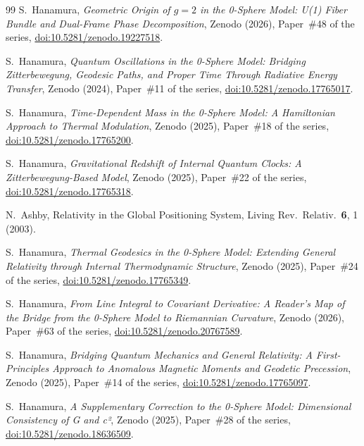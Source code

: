 \documentclass[%
 reprint, amsmath,amssymb, aps, prb, ]{revtex4-2}
\numberwithin{equation}{section}
\begin{document}
\begin{thebibliography}{99}
 S.~Hanamura, \emph{Geometric Origin of $g = 2$ in the 0-Sphere Model: U(1) Fiber Bundle and Dual-Frame Phase Decomposition}, Zenodo (2026), Paper~\#48 of the series, \href{https://doi.org/10.5281/zenodo.19227518}{doi:10.5281/zenodo.19227518}.

 S.~Hanamura, \emph{Quantum Oscillations in the 0-Sphere Model: Bridging Zitterbewegung, Geodesic Paths, and Proper Time Through Radiative Energy Transfer}, Zenodo (2024), Paper~\#11 of the series, \href{https://doi.org/10.5281/zenodo.17765017}{doi:10.5281/zenodo.17765017}.

 S.~Hanamura, \emph{Time-Dependent Mass in the 0-Sphere Model: A Hamiltonian Approach to Thermal Modulation}, Zenodo (2025), Paper~\#18 of the series, \href{https://doi.org/10.5281/zenodo.17765200}{doi:10.5281/zenodo.17765200}.

 S.~Hanamura, \emph{Gravitational Redshift of Internal Quantum Clocks: A Zitterbewegung-Based Model}, Zenodo (2025), Paper~\#22 of the series, \href{https://doi.org/10.5281/zenodo.17765318}{doi:10.5281/zenodo.17765318}.

 N.~Ashby, Relativity in the Global Positioning System, Living Rev.\ Relativ.\ \textbf{6}, 1 (2003).

 S.~Hanamura, \emph{Thermal Geodesics in the 0-Sphere Model: Extending General Relativity through Internal Thermodynamic Structure}, Zenodo (2025), Paper~\#24 of the series, \href{https://doi.org/10.5281/zenodo.17765349}{doi:10.5281/zenodo.17765349}.

 S.~Hanamura, \emph{From Line Integral to Covariant Derivative: A Reader's Map of the Bridge from the 0-Sphere Model to Riemannian Curvature}, Zenodo (2026), Paper~\#63 of the series, \href{https://doi.org/10.5281/zenodo.20767589}{doi:10.5281/zenodo.20767589}.

 S.~Hanamura, \emph{Bridging Quantum Mechanics and General Relativity: A First-Principles Approach to Anomalous Magnetic Moments and Geodetic Precession}, Zenodo (2025), Paper~\#14 of the series, \href{https://doi.org/10.5281/zenodo.17765097}{doi:10.5281/zenodo.17765097}.

 S.~Hanamura, \emph{A Supplementary Correction to the 0-Sphere Model: Dimensional Consistency of G and c²}, Zenodo (2025), Paper~\#28 of the series, \href{https://doi.org/10.5281/zenodo.18636509}{doi:10.5281/zenodo.18636509}.


\end{thebibliography}
\end{document}
